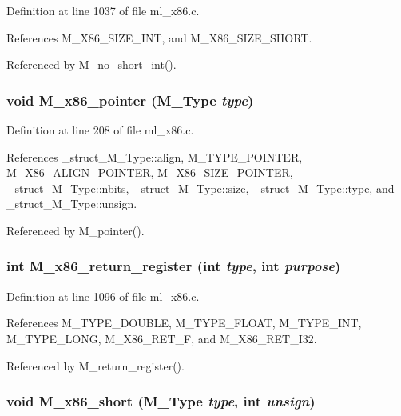 Definition at line 1037 of file ml\_\-x86.c.

References M\_\-X86\_\-SIZE\_\-INT, and M\_\-X86\_\-SIZE\_\-SHORT.

Referenced by M\_\-no\_\-short\_\-int().
\subsubsection{\setlength{\rightskip}{0pt plus 5cm}void M\_\-x86\_\-pointer (\bf{M\_\-Type} {\em type})}\label{m__x86_8h_9c529d82b3fd27fe93a9bbf967632659}




Definition at line 208 of file ml\_\-x86.c.

References \_\-struct\_\-M\_\-Type::align, M\_\-TYPE\_\-POINTER, M\_\-X86\_\-ALIGN\_\-POINTER, M\_\-X86\_\-SIZE\_\-POINTER, \_\-struct\_\-M\_\-Type::nbits, \_\-struct\_\-M\_\-Type::size, \_\-struct\_\-M\_\-Type::type, and \_\-struct\_\-M\_\-Type::unsign.

Referenced by M\_\-pointer().
\subsubsection{\setlength{\rightskip}{0pt plus 5cm}int M\_\-x86\_\-return\_\-register (int {\em type}, int {\em purpose})}\label{m__x86_8h_5c58ab9d70640c1278564a25f5217d65}




Definition at line 1096 of file ml\_\-x86.c.

References M\_\-TYPE\_\-DOUBLE, M\_\-TYPE\_\-FLOAT, M\_\-TYPE\_\-INT, M\_\-TYPE\_\-LONG, M\_\-X86\_\-RET\_\-F, and M\_\-X86\_\-RET\_\-I32.

Referenced by M\_\-return\_\-register().
\subsubsection{\setlength{\rightskip}{0pt plus 5cm}void M\_\-x86\_\-short (\bf{M\_\-Type} {\em type}, int {\em unsign})}\label{m__x86_8h_8a66fb0210defe9dde756f6a338b787d}




